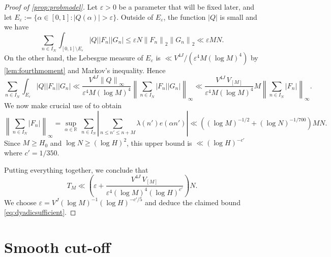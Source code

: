 \documentclass[11pt]{amsart}
\theoremstyle{definition}
\renewcommand{\leq}{\leqslant}
\renewcommand{\geq}{\geqslant}
\newcommand{\norm}[1]{\left\|#1\right\|}
\newcommand{\abs}[1]{\left|#1\right|}
\newcommand{\eps}{\varepsilon}
\newcommand{\R}{\mathbb{R}}
\newcommand{\N}{I_N}
\newcommand{\curlyLpower}{V^{\repR}}
\newcommand{\curlyLexp}[1]{V^{#1}}
\newcommand{\repR}{J}
\newcommand{\otherK}{M}
\begin{document}
\begin{proof}[Proof of \cref{prop:probmodel}]
Let $\eps>0$ be a parameter that will be fixed later, and let $E_\eps := \{\alpha\in [0, 1] : |Q(\alpha)| > \eps\}$. Outside of $E_{\eps}$, the function $|Q|$ is small and we have 
\begin{equation*}
\sum_{n\in \N} \int_{[0, 1]\setminus E_{\eps}} |Q||F_n| |G_n| \leq \eps N \norm{F_n}_2 \norm{G_n}_2 \ll \eps \otherK N.
\end{equation*}
On the other hand, the Lebesgue measure of $E_{\eps}$ is $\ll \curlyLexp{4\repR}/(\eps^4 \otherK (\log \otherK)^4)$ by \cref{lem:fourthmoment} and Markov's inequality. Hence
\begin{equation*}
\sum_{n\in \N} \int_{E_{\eps}} |Q||F_n| |G_n| \ll \frac{\curlyLexp{4\repR} \norm{Q}_{\infty} }{\eps^4 \otherK (\log \otherK)^4} \norm{\sum_{n\in \N} |F_n||G_n|}_{\infty}\!\! \ll \frac{\curlyLexp{4\repR}  \, V_{[\otherK]}}{\eps^4 \otherK (\log \otherK)^4} \otherK \norm{\sum_{n\in \N} |F_n|}_{\infty}.
\end{equation*}
We now make crucial use of \cite[Theorem~1.3]{MRT} to obtain
\begin{equation*}
 	\norm{\sum_{n\in \N} |F_n|}_{\infty} \!\! = \sup_{\alpha\in \R}\, \sum_{n\in \N} \abs{\sum_{n\leq n'\leq n+\otherK} \lambda(n') e(\alpha n')} \ll \left((\log \otherK)^{-1/2} + (\log N)^{-1/700} \right) \otherK N.
\end{equation*}
Since $\otherK \geq H_0$ and $\log N \geq (\log H)^2$, this upper bound is $\ll (\log H)^{-c'}$ where $c' = 1/350$.

Putting everything together, we conclude that 
\begin{equation*}
T_{\otherK}  \ll \left(\eps +\frac{\curlyLexp{4\repR}\, V_{[\otherK]}}{\eps^4 (\log \otherK )^4 (\log H)^{c'}} \right) N.
\end{equation*}
We choose $\eps = \curlyLpower (\log \otherK )^{-1} (\log H)^{-c'/5}$ and deduce the claimed bound \cref{eq:dyadicsufficient}.
\end{proof}

\section{Smooth cut-off}
\label{sec:smoothcutoff}

\smoothcutoff
\end{document}
